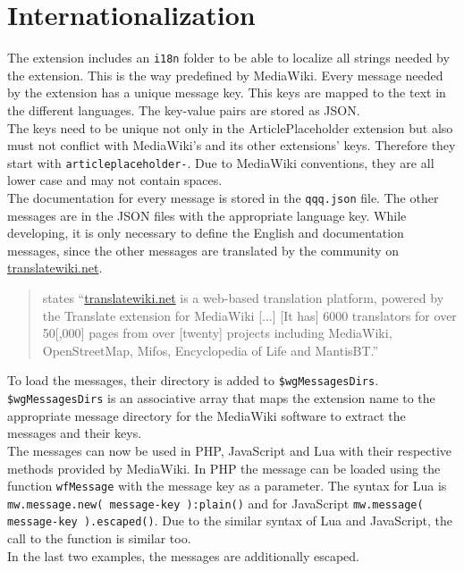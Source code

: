 \section{Internationalization}

The extension includes an \texttt{\justify i18n} folder to be able to localize all strings needed by the extension. This is the way predefined by MediaWiki.  Every message needed by the extension has a unique message key. This keys are mapped to the text in the different languages. The key-value pairs are stored as JSON. \citep{wiki:34} \\
The keys need to be unique not only in the ArticlePlaceholder extension but also must not conflict with MediaWiki's and its other extensions' keys. Therefore they start with \texttt{\justify articleplaceholder-}. Due to MediaWiki conventions, they are all lower case and may not contain spaces. \\
The documentation for every message is stored in the \texttt{\justify qqq.json} file. The other messages are in the JSON files with the appropriate language key. While developing, it is only necessary to define the English and documentation messages, since the other messages are translated by the community on \url{translatewiki.net}.
\begin{quote}
 \citet{wiki:26} states ``\url{translatewiki.net} is a web-based translation platform, powered by the Translate extension for MediaWiki [...] [It has] 6000 translators for over 50[,000] pages from over [twenty] projects including MediaWiki, OpenStreetMap, Mifos, Encyclopedia of Life and MantisBT.''
\end{quote}

To load the messages, their directory is added to \texttt{\justify \$wgMessagesDirs}. \texttt{\justify \$wgMessagesDirs} is an associative array that maps the extension name to the appropriate message directory for the MediaWiki software to extract the messages and their keys. \\
The messages can now be used in PHP, JavaScript and Lua with their respective methods provided by MediaWiki. In PHP the message can be loaded using the function \texttt{\justify wfMessage} with the message key as a parameter. The syntax for Lua is \texttt{\justify mw.message.new( message-key ):plain()} and for JavaScript \texttt{\justify mw.message( message-key ).escaped()}. Due to the similar syntax of Lua and JavaScript, the call to the function is similar too. \\ 
In the last two examples, the messages are additionally escaped.